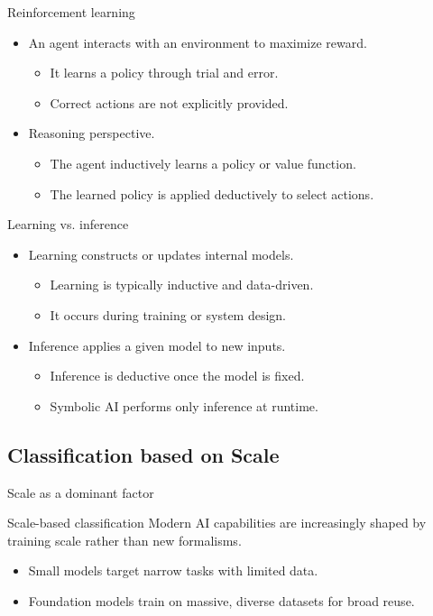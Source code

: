 \documentclass[12pt]{beamer}
\begin{document}
\begin{frame}{Reinforcement learning}
  \begin{itemize}
    \item An agent interacts with an environment to maximize reward.
      \begin{itemize}
        \item It learns a policy through trial and error.
        \item Correct actions are not explicitly provided.
      \end{itemize}
    \item Reasoning perspective.
      \begin{itemize}
        \item The agent inductively learns a policy or value function.
        \item The learned policy is applied deductively to select actions.
      \end{itemize}
  \end{itemize}
\end{frame}

\begin{frame}{Learning vs. inference}
  \begin{itemize}
    \item Learning constructs or updates internal models.
      \begin{itemize}
        \item Learning is typically inductive and data-driven.
        \item It occurs during training or system design.
      \end{itemize}
    \item Inference applies a given model to new inputs.
      \begin{itemize}
        \item Inference is deductive once the model is fixed.
        \item Symbolic AI performs only inference at runtime.
      \end{itemize}
  \end{itemize}
\end{frame}

\subsection{Classification based on Scale}

\begin{frame}{Scale as a dominant factor}
  \begin{conceptbox}{Scale-based classification}
    Modern AI capabilities are increasingly shaped by training scale rather than new formalisms.
  \end{conceptbox}
  \begin{itemize}
    \item Small models target narrow tasks with limited data.
    \item Foundation models train on massive, diverse datasets for broad reuse.
  \end{itemize}
\end{frame}
\end{document}
